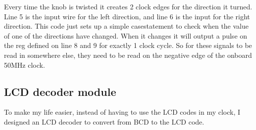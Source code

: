 \documentclass[12pt,a4paper,hidelinks]{article}            %
\begin{document}
Every time the knob is twisted it creates 2 clock edges for the direction it turned. Line 5 is the input wire for the left direction, and line 6 is the input for the right direction. This code just sets up a simple casestatement to check when the value of one of the directions have changed. When it changes it will output a pulse on the reg defined on line 8 and 9 for exactly 1 clock cycle. So for these signals to be read in somewhere else, they need to be read on the negative edge of the onboard 50MHz clock.

\subsection{LCD decoder module}

To make my life easier, instead of having to use the LCD codes in my clock, I designed an LCD decoder to convert from BCD to the LCD code.
\end{document}
